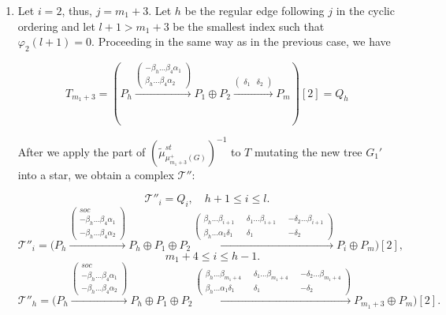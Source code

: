 \documentclass[12pt]{amsart}
\theoremstyle{plain}
\theoremstyle{remark}
\theoremstyle{definition}
\begin{document}
\begin{enumerate}
\begin{enumerate}
\begin{enumerate}
Applying the rest of $(\widetilde{\mu}^{st}_{\mu^+_{m_1+m_2+3}(G)})^{-1}$, we get 
$$\mathcal{T}_{i}= \mathcal{T}_{i-1}' = \bigg(P_h \xrightarrow{soc} P_h \xrightarrow{\beta_h\dots\beta_{i}} P_{i-1}\bigg), \quad m_1+m_2+5 \leq i \leq h, $$
$$\mathcal{T}_{m_1+m_2+3} = P_h, $$
$$\mathcal{T}_{m_1+m_2+4} = \mathcal{T}_h' = (P_h \xrightarrow{soc} P_h \xrightarrow{\beta_4\dots\beta_{m_1+m_2+4}} P_{m_1+m_2+3}) $$
$$\mathcal{T}_i = \mathcal{T}_i' = P_i, \text{ otherwise.}$$
$$\mathcal{H}(\Lambda) = t_{m_1+m_2+4}^{-1} \circ \dots \circ t_{h}^{-1}(\Lambda).$$
The next two cases are very similar to the one just discussed. 
\item Let $i=2$, thus, $j=m_1+3$. Let $h$ be the regular edge following $j$ in the cyclic ordering and let $l+1 > m_1+3$ be the smallest index such that $\varphi_2(l+1) = 0$. Proceeding in the same way as in the previous case, we have 

$$T_{m_1+3} = (P_h \xrightarrow{ \begin{pmatrix} -\beta_h \dots \beta_4 \alpha_1 \\ \beta_h \dots \beta_4 \alpha_2 \end{pmatrix}} P_1\oplus P_{2} \xrightarrow{ \begin{pmatrix} \delta_1 & \delta_2 \end{pmatrix}} P_{m})[2] = Q_h $$

After we apply the part of $(\widetilde{\mu}^{st}_{\mu^+_{m_1+3}(G)})^{-1}$ to $T$ mutating the new tree $G_1'$ into a star, we obtain a complex $\mathcal{T}''$: 

$$\mathcal{T}''_i = Q_i, \quad h+1 \leq i \leq l.$$
$$\mathcal{T}''_i = \bigg(P_h \xrightarrow{\begin{pmatrix} soc \\ -\beta_h\dots\beta_4\alpha_1 \\ -\beta_h \dots \beta_4\alpha_2 \end{pmatrix}}P_h \oplus P_1 \oplus P_{2} \xrightarrow{ \begin{pmatrix} \beta_h\dots\beta_{i+1} && \delta_1\dots \beta_{i+1} && -\delta_2\dots \beta_{i+1} \\ \beta_h \dots \alpha_1\delta_1  && \delta_1 && -\delta_2 \end{pmatrix}} P_i \oplus P_{m} \bigg)[2], $$ $$\quad m_1 +4 \leq i \leq h-1.$$
$$\mathcal{T}''_h = \bigg(P_h \xrightarrow{\begin{pmatrix} soc \\ -\beta_h\dots\beta_4\alpha_1\\ -\beta_h\dots\beta_4\alpha_2 \end{pmatrix}}P_h \oplus P_1 \oplus P_{2} \xrightarrow{ \begin{pmatrix}  \beta_h\dots\beta_{m_1+4} && \delta_1\dots \beta_{m_1+4} && -\delta_2\dots \beta_{m_1+4} \\ \beta_h \dots \alpha_1\delta_1 && \delta_1 && -\delta_2 \end{pmatrix}} P_{m_1+3} \oplus P_{m} \bigg)[2]. $$


\end{enumerate}
\end{enumerate}
\end{enumerate}
\end{document}
